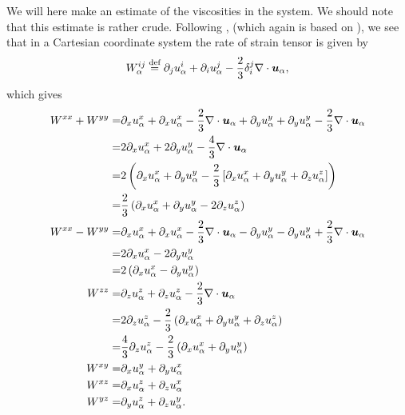 We will here make an estimate of the viscosities in the system.
We should note that this estimate is rather crude.
Following \cite{Helander2002book}, (which again is based on \cite{Braginskii1965}), we see that in a Cartesian coordinate system the rate of strain tensor is given by
%
\begin{align*}
    W^{ij}_{\alpha} \overset{\text{def}}{=} \partial_j u^{i}_{\alpha}
                     + \partial_i u^{j}_{\alpha}
                     - \frac{2}{3} \delta_i^j \nabla\cdot \boldsymbol{u}_{\alpha},
\end{align*}
%
which gives
\begin{align*}
W^{xx} + W^{yy}
=&
\partial_x u^{x}_{\a}
+ \partial_x u^{x}_{\a}
- \frac{2}{3} \div \ve{u}_{\a}
+ \partial_y u^{y}_{\a}
+ \partial_y u^{y}_{\a}
- \frac{2}{3} \div \ve{u}_{\a}
\\
=&
2\partial_x u^{x}_{\a}
+ 2\partial_y u^{y}_{\a}
- \frac{4}{3} \div \ve{u}_{\a}
\\
=&
2\L(\partial_x u^{x}_{\a}
    + \partial_y u^{y}_{\a}
    - \frac{2}{3} \L[\partial_x u^{x}_{\a}
          +\partial_y u^{y}_{\a}
          +\partial_z u^{z}_{\a}
                      \R] \R)
\\
=&
\frac{2}{3}\L(\partial_x u^{x}_{\a}
          + \partial_y u^{y}_{\a}
          - 2\partial_z u^{z}_{\a} \R)
\\
%
%
%
W^{xx} - W^{yy}
=&
\partial_x u^{x}_{\a}
+ \partial_x u^{x}_{\a}
- \frac{2}{3} \div \ve{u}_{\a}
- \partial_y u^{y}_{\a}
- \partial_y u^{y}_{\a}
+ \frac{2}{3} \div \ve{u}_{\a}
\\
=&
2\partial_x u^{x}_{\a} -2 \partial_y u^{y}_{\a}
\\
=&
2\L(\partial_x u^{x}_{\a} - \partial_y u^{y}_{\a} \R)
\\
%
%
%
W^{zz}
=&
\partial_z u^{z}_{\a} + \partial_z u^{z}_{\a} - \frac{2}{3} \div \ve{u}_{\a}
\\
%
=&
2\partial_z u^{z}_{\a} - \frac{2}{3}
    \L(\partial_x u^{x}_{\a}
       +\partial_y u^{y}_{\a}
       +\partial_z u^{z}_{\a}
    \R)
\\
%
=&
\frac{4}{3} \partial_z u^{z}_{\a} - \frac{2}{3}
    \L(\partial_x u^{x}_{\a}
       +\partial_y u^{y}_{\a}
    \R)
\\
%
%
%
%
W^{xy}
=&
\partial_x u^{y}_{\a} + \partial_y u^{x}_{\a}
\\
%
%
%
%
W^{xz}
=&
\partial_x u^{z}_{\a} + \partial_z u^{x}_{\a}
\\
%
%
%
W^{yz}
=&
\partial_y u^{z}_{\a} + \partial_z u^{y}_{\a}.
%
\end{align*}
